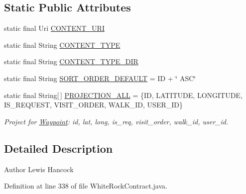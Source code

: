 \subsection*{Static Public Attributes}
\begin{DoxyCompactItemize}
\item 
static final Uri \hyperlink{classuk_1_1ac_1_1swan_1_1digitaltrails_1_1database_1_1_white_rock_contract_1_1_waypoint_a03d3daf433fe84895c9a47b9da814aff}{C\+O\+N\+T\+E\+N\+T\+\_\+\+U\+R\+I}
\item 
static final String \hyperlink{classuk_1_1ac_1_1swan_1_1digitaltrails_1_1database_1_1_white_rock_contract_1_1_waypoint_ae5f4f0f1a43cecb919c00282a2283a55}{C\+O\+N\+T\+E\+N\+T\+\_\+\+T\+Y\+P\+E}
\item 
static final String \hyperlink{classuk_1_1ac_1_1swan_1_1digitaltrails_1_1database_1_1_white_rock_contract_1_1_waypoint_a28c77b6244baebc10e1b9a9859bb9623}{C\+O\+N\+T\+E\+N\+T\+\_\+\+T\+Y\+P\+E\+\_\+\+D\+I\+R}
\item 
static final String \hyperlink{classuk_1_1ac_1_1swan_1_1digitaltrails_1_1database_1_1_white_rock_contract_1_1_waypoint_a54ae4eab6dd619ff5bf520d3c7c80542}{S\+O\+R\+T\+\_\+\+O\+R\+D\+E\+R\+\_\+\+D\+E\+F\+A\+U\+L\+T} = I\+D + \char`\"{} A\+S\+C\char`\"{}
\item 
static final String\mbox{[}$\,$\mbox{]} \hyperlink{classuk_1_1ac_1_1swan_1_1digitaltrails_1_1database_1_1_white_rock_contract_1_1_waypoint_a25cdbc9a6b814bd5b8e73a479a169a89}{P\+R\+O\+J\+E\+C\+T\+I\+O\+N\+\_\+\+A\+L\+L} = \{I\+D, L\+A\+T\+I\+T\+U\+D\+E, L\+O\+N\+G\+I\+T\+U\+D\+E, I\+S\+\_\+\+R\+E\+Q\+U\+E\+S\+T, V\+I\+S\+I\+T\+\_\+\+O\+R\+D\+E\+R, W\+A\+L\+K\+\_\+\+I\+D, U\+S\+E\+R\+\_\+\+I\+D\}
\begin{DoxyCompactList}\small\item\em Project for \hyperlink{classuk_1_1ac_1_1swan_1_1digitaltrails_1_1database_1_1_white_rock_contract_1_1_waypoint}{Waypoint}\+: id, lat, long, is\+\_\+req, visit\+\_\+order, walk\+\_\+id, user\+\_\+id. \end{DoxyCompactList}\end{DoxyCompactItemize}


\subsection{Detailed Description}
\begin{DoxyAuthor}{Author}
Lewis Hancock 
\end{DoxyAuthor}


Definition at line 338 of file White\+Rock\+Contract.\+java.



